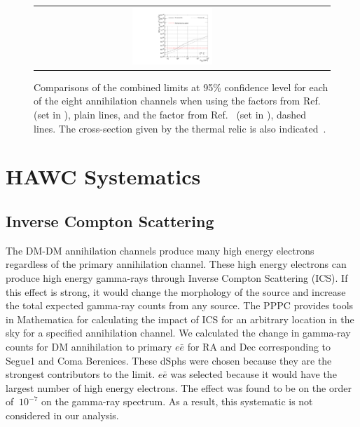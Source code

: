 \begin{figure}[ht]
{\begin{tabular}{ccc}
    \includegraphics[width=0.3\textwidth]{figures/glory_duck/comparison/GD_limits_tautau.pdf} &
    \end{tabular}
    }
    \caption{Comparisons of the combined limits at 95\% confidence level for each of the eight annihilation channels when using the \J factors from Ref.~\cite{Geringer-Sameth:2014yza} (\GS set in ), plain lines, and the \J factor from Ref.~\cite{Bonnivard:2014kza, Bonnivard:2015xpq} (\B set in ), dashed lines. The cross-section given by the thermal relic is also indicated~\cite{Bertone_2005}.}
\label{fig:limits-comparison}
\end{figure}

\section{HAWC Systematics} \label{sec:hawc_systematic}

\subsection{Inverse Compton Scattering} \label{sec:gd_ics}
The DM-DM annihilation channels produce many high energy electrons regardless of the primary annihilation channel.
These high energy electrons can produce high energy gamma-rays through Inverse Compton Scattering (ICS).
If this effect is strong, it would change the morphology of the source and increase the total expected gamma-ray counts from any source.
The PPPC \cite{Cirelli_2011} provides tools in Mathematica for calculating the impact of ICS for an arbitrary location in the sky for a specified annihilation channel.
We calculated the change in gamma-ray counts for DM annihilation to primary $e\bar{e}$ for RA and Dec corresponding to Segue1 and Coma Berenices.
These dSphs were chosen because they are the strongest contributors to the limit.
$e\bar{e}$ was selected because it would have the largest number of high energy electrons.
The effect was found to be on the order of $~10^{-7}$ on the gamma-ray spectrum.
As a result, this systematic is not considered in our analysis.

